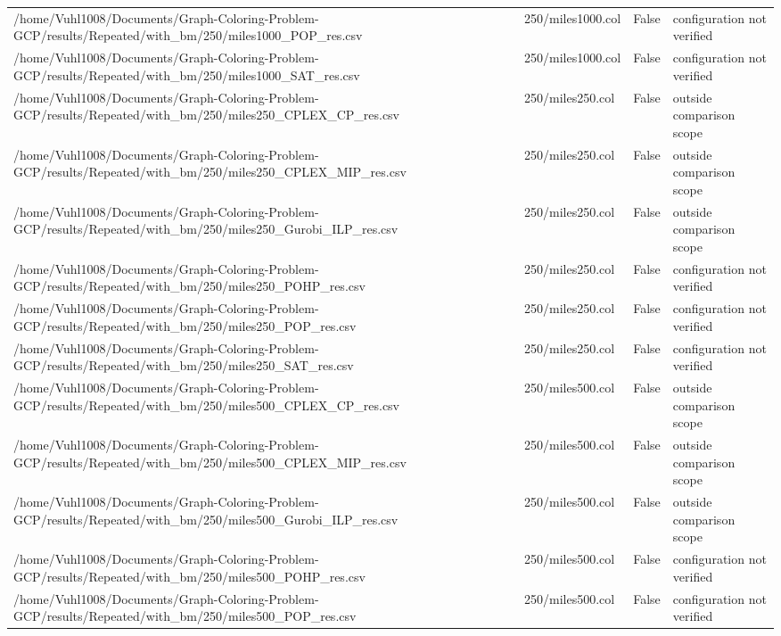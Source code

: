 \begin{table}[htbp]
\begin{tabular}{llll}
/home/Vuhl1008/Documents/Graph-Coloring-Problem-GCP/results/Repeated/with\_bm/250/miles1000\_POP\_res.csv & 250/miles1000.col & False & configuration not verified \\
/home/Vuhl1008/Documents/Graph-Coloring-Problem-GCP/results/Repeated/with\_bm/250/miles1000\_SAT\_res.csv & 250/miles1000.col & False & configuration not verified \\
/home/Vuhl1008/Documents/Graph-Coloring-Problem-GCP/results/Repeated/with\_bm/250/miles250\_CPLEX\_CP\_res.csv & 250/miles250.col & False & outside comparison scope \\
/home/Vuhl1008/Documents/Graph-Coloring-Problem-GCP/results/Repeated/with\_bm/250/miles250\_CPLEX\_MIP\_res.csv & 250/miles250.col & False & outside comparison scope \\
/home/Vuhl1008/Documents/Graph-Coloring-Problem-GCP/results/Repeated/with\_bm/250/miles250\_Gurobi\_ILP\_res.csv & 250/miles250.col & False & outside comparison scope \\
/home/Vuhl1008/Documents/Graph-Coloring-Problem-GCP/results/Repeated/with\_bm/250/miles250\_POHP\_res.csv & 250/miles250.col & False & configuration not verified \\
/home/Vuhl1008/Documents/Graph-Coloring-Problem-GCP/results/Repeated/with\_bm/250/miles250\_POP\_res.csv & 250/miles250.col & False & configuration not verified \\
/home/Vuhl1008/Documents/Graph-Coloring-Problem-GCP/results/Repeated/with\_bm/250/miles250\_SAT\_res.csv & 250/miles250.col & False & configuration not verified \\
/home/Vuhl1008/Documents/Graph-Coloring-Problem-GCP/results/Repeated/with\_bm/250/miles500\_CPLEX\_CP\_res.csv & 250/miles500.col & False & outside comparison scope \\
/home/Vuhl1008/Documents/Graph-Coloring-Problem-GCP/results/Repeated/with\_bm/250/miles500\_CPLEX\_MIP\_res.csv & 250/miles500.col & False & outside comparison scope \\
/home/Vuhl1008/Documents/Graph-Coloring-Problem-GCP/results/Repeated/with\_bm/250/miles500\_Gurobi\_ILP\_res.csv & 250/miles500.col & False & outside comparison scope \\
/home/Vuhl1008/Documents/Graph-Coloring-Problem-GCP/results/Repeated/with\_bm/250/miles500\_POHP\_res.csv & 250/miles500.col & False & configuration not verified \\
/home/Vuhl1008/Documents/Graph-Coloring-Problem-GCP/results/Repeated/with\_bm/250/miles500\_POP\_res.csv & 250/miles500.col & False & configuration not verified \\

\end{tabular}
\end{table}
